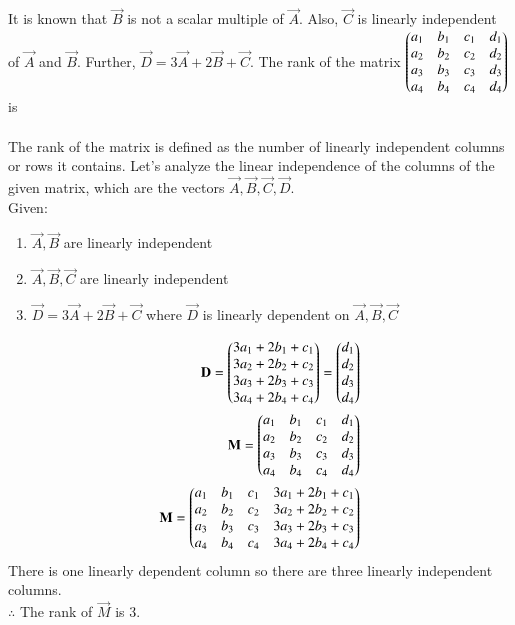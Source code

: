 \documentclass[journal]{IEEEtran}
\begin{document}
It is known that $\vec{B}$ is not a scalar multiple of $\vec{A}$. Also, $\vec{C}$ is linearly independent of $\vec{A}$ and $\vec{B}$. Further, $\vec{D} = 3\vec{A} + 2\vec{B} + \vec{C}$. The rank of the matrix
$
\begin{pmatrix}
a_1 & b_1 & c_1 & d_1 \\
a_2 & b_2 & c_2 & d_2 \\
a_3 & b_3 & c_3 & d_3 \\
a_4 & b_4 & c_4 & d_4
\end{pmatrix}
$
is  \\
\solution\\
The rank of the matrix is defined as the number of linearly independent columns or rows it contains. Let's analyze the linear independence of the columns of the given matrix, which are the vectors $\vec{A},\vec{B},\vec{C},\vec{D}$.\\
Given:
\begin{enumerate}
    \item $\vec{A},\vec{B}$ are linearly independent
    \item $\vec{A},\vec{B},\vec{C}$ are linearly independent
    \item $\vec{D}=3\vec{A}+2\vec{B}+\vec{C}$ where $\vec{D}$ is linearly dependent on $\vec{A},\vec{B},\vec{C}$
\end{enumerate}
\begin{align}
   \mathbf{D}=\begin{pmatrix}3a_1+2b_1+c_1\\3a_2+2b_2+c_2\\3a_3+2b_3+c_3\\3a_4+2b_4+c_4\end{pmatrix}=\begin{pmatrix}d_1\\d_2\\d_3\\d_4\end{pmatrix}\\
    \mathbf{M}=\begin{pmatrix}a_1 & b_1 & c_1 & d_1 \\
a_2 & b_2 & c_2 & d_2 \\
a_3 & b_3 & c_3 & d_3 \\
a_4 & b_4 & c_4 & d_4\end{pmatrix}\\
    \mathbf{M}=\begin{pmatrix}a_1 & b_1 & c_1 & 3a_1+2b_1+c_1\\
a_2 & b_2 & c_2 & 3a_2+2b_2+c_2 \\
a_3 & b_3 & c_3 & 3a_3+2b_3+c_3 \\
a_4 & b_4 & c_4 & 3a_4+2b_4+c_4\end{pmatrix}
\end{align}
There is one linearly dependent column so there are three linearly independent columns.\\
$\therefore$ The rank of $\vec{M}$ is 3.
\end{document}

